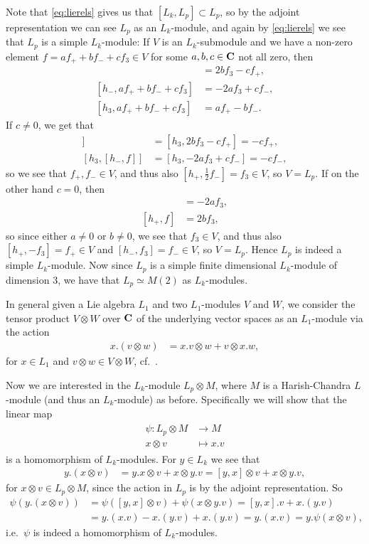 Note that \cref{eq:lierels} gives us that $[L_k,L_p]\subset L_p$, so by the adjoint representation we can see $L_p$ as an $L_k$-module, and again by \cref{eq:lierels} we see that $L_p$ is a simple $L_k$-module: If $V$ is an $L_k$-submodule and we have a non-zero element $f=af_++bf_-+cf_3\in V$ for some $a,b,c\in\mathbf{C}$ not all zero, then
\begin{align*}
  [h_+,af_++bf_-+cf_3] &= 2bf_3-cf_+, \\
  [h_-,af_++bf_-+cf_3] &= -2af_3+cf_-, \\
  [h_3,af_++bf_-+cf_3] &= af_+-bf_-.
\end{align*}
If $c\neq0$, we get that
\begin{align*}
  [h_3,[h_+,f]] &= [h_3,2bf_3-cf_+] = -cf_+, \\
  [h_3,[h_-,f]] &= [h_3,-2af_3+cf_-] = -cf_-,
\end{align*}
so we see that $f_+,f_-\in V$, and thus also $[h_+,\tfrac{1}{2}f_-]=f_3\in V$, so $V=L_p$. If on the other hand $c=0$, then
\begin{align*}
  [h_-,f] &= -2af_3, \\
  [h_+,f] &= 2bf_3,
\end{align*}
so since either $a\neq 0$ or $b\neq 0$, we see that $f_3\in V$, and thus also $[h_+,-f_3]=f_+\in V$ and $[h_-,f_3]=f_-\in V$, so $V=L_p$. Hence $L_p$ is indeed a simple $L_k$-module. Now since $L_p$ is a simple finite dimensional $L_k$-module of dimension 3, we have that $L_p\simeq M(2)$ as $L_k$-modules.

In general given a Lie algebra $L_1$ and two $L_1$-modules $V$ and $W$, we consider the tensor product $V\otimes W$ over $\mathbf{C}$ of the underlying vector spaces as an $L_1$-module via the action
\begin{align}\label{eq:tensoraction}
  x.(v\otimes w) &= x.v\otimes w + v\otimes x.w,
\end{align}
for $x\in L_1$ and $v\otimes w\in V\otimes W$, cf.\ \cite[26]{humphrey}.

Now we are interested in the $L_k$-module $L_p\otimes M$, where $M$ is a Harish-Chandra $L$-module (and thus an $L_k$-module) as before. Specifically we will show that the linear map
\begin{align}
  \begin{split} \label{eq:psi}
    \psi \colon L_p\otimes M &\to M \\
    x\otimes v &\mapsto x.v
  \end{split}
\end{align}
is a homomorphism of $L_k$-modules. For $y\in L_k$ we see that
\begin{align*}
  y.(x\otimes v) &= y.x\otimes v + x\otimes y.v = [y,x]\otimes v + x\otimes y.v,
\end{align*}
for $x\otimes v\in L_p\otimes M$, since the action in $L_p$ is by the adjoint representation. So
\begin{align*}
  \psi(y.(x\otimes v)) &= \psi([y,x]\otimes v) + \psi(x\otimes y.v) = [y,x].v + x.(y.v) \\
  &= y.(x.v)-x.(y.v)+x.(y.v) = y.(x.v) = y.\psi(x\otimes v),
\end{align*}
i.e.\ $\psi$ is indeed a homomorphism of $L_k$-modules.

